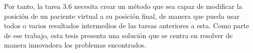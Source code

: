 Por tanto, la tarea 3.6 necesita crear un método que sea capaz de modificar la posición de un paciente virtual a su posición final, de manera que pueda usar todos o varios resultados intermedios de las tareas anteriores a esta. Como parte de ese trabajo, esta tesis presenta una solución que se centra en resolver de manera innovadora los problemas encontrados.

